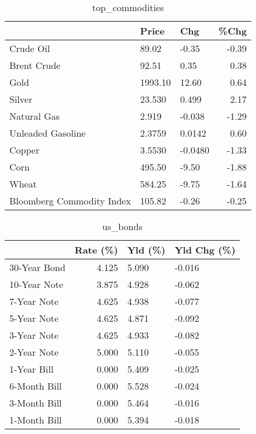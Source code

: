 \documentclass{article}%
\begin{document}
\begin{table}[htbp]%
\caption{top\_commodities}%
\centering%
\begin{adjustbox}{width=1\textwidth}%
\begin{tabular}{lllr}
\toprule
                          &   Price &     Chg &  \%Chg \\
\midrule
               Crude Oil  &   89.02 &   -0.35 & -0.39 \\
             Brent Crude  &   92.51 &    0.35 &  0.38 \\
                    Gold  & 1993.10 &   12.60 &  0.64 \\
                  Silver  &  23.530 &   0.499 &  2.17 \\
             Natural Gas  &   2.919 &  -0.038 & -1.29 \\
       Unleaded Gasoline  &  2.3759 &  0.0142 &  0.60 \\
                  Copper  &  3.5530 & -0.0480 & -1.33 \\
                    Corn  &  495.50 &   -9.50 & -1.88 \\
                   Wheat  &  584.25 &   -9.75 & -1.64 \\
Bloomberg Commodity Index &  105.82 &   -0.26 & -0.25 \\
\bottomrule
\end{tabular}
%
\end{adjustbox}%
\end{table}

%


\begin{table}[htbp]%
\caption{us\_bonds}%
\centering%
\begin{adjustbox}{width=1\textwidth}%
\begin{tabular}{lrll}
\toprule
             &  Rate (\%) & Yld (\%) & Yld Chg (\%) \\
\midrule
30-Year Bond &     4.125 &   5.090 &      -0.016 \\
10-Year Note &     3.875 &   4.928 &      -0.062 \\
 7-Year Note &     4.625 &   4.938 &      -0.077 \\
 5-Year Note &     4.625 &   4.871 &      -0.092 \\
 3-Year Note &     4.625 &   4.933 &      -0.082 \\
 2-Year Note &     5.000 &   5.110 &      -0.055 \\
 1-Year Bill &     0.000 &   5.409 &      -0.025 \\
6-Month Bill &     0.000 &   5.528 &      -0.024 \\
3-Month Bill &     0.000 &   5.464 &      -0.016 \\
1-Month Bill &     0.000 &   5.394 &      -0.018 \\
\bottomrule
\end{tabular}
%
\end{adjustbox}%
\end{table}
\end{document}
